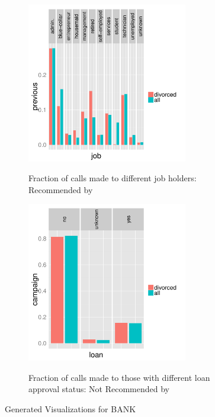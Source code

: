 \begin{figure}[h] 
\centering
\begin{subfigure}{0.8\linewidth}
\centering
{\includegraphics[width=7cm] {Images/seedb_dim_job_measure_previous.pdf}}
\caption{Fraction of calls made to different job holders: Recommended by \VizRecDB}
\label{fig:job}
\end{subfigure}
\begin{subfigure}{0.8\linewidth}
\centering
{\includegraphics[width=7cm] {Images/seedb_dim_loan_measure_campaign.pdf}}
\caption{Fraction of calls made to those with different loan approval status: Not Recommended by \VizRecDB}
\label{fig:loan}
\end{subfigure}
\vspace{-10pt}
\caption{\VizRecDB Generated Visualizations for BANK}\label{fig:qual-study2}

\vspace{-10pt}
\end{figure}